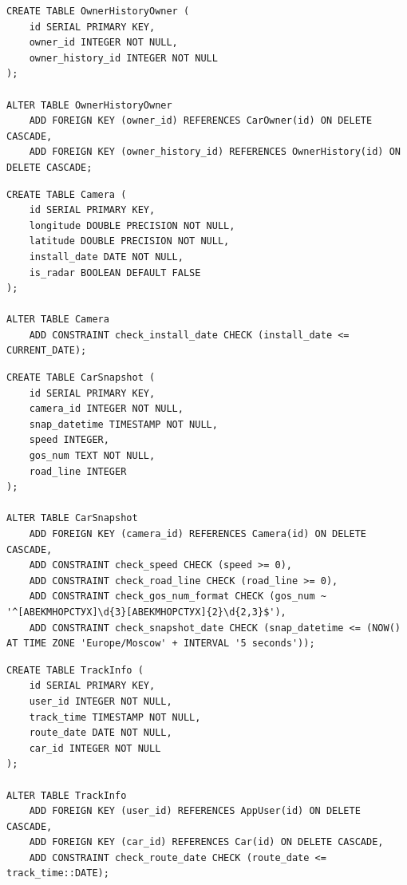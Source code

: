 \begin{center}
\captionsetup{justification=raggedright,singlelinecheck=off}
\begin{lstlisting}[label=tablecreate-7, caption=Создание таблицы OwnerHistoryOwner]
CREATE TABLE OwnerHistoryOwner (
    id SERIAL PRIMARY KEY,
    owner_id INTEGER NOT NULL,
    owner_history_id INTEGER NOT NULL
);

ALTER TABLE OwnerHistoryOwner
    ADD FOREIGN KEY (owner_id) REFERENCES CarOwner(id) ON DELETE CASCADE,
    ADD FOREIGN KEY (owner_history_id) REFERENCES OwnerHistory(id) ON DELETE CASCADE;
\end{lstlisting}
\end{center}

\begin{center}
\captionsetup{justification=raggedright,singlelinecheck=off}
\begin{lstlisting}[label=tablecreate-8, caption=Создание таблицы Camera]
CREATE TABLE Camera (
    id SERIAL PRIMARY KEY,
    longitude DOUBLE PRECISION NOT NULL,
    latitude DOUBLE PRECISION NOT NULL,
    install_date DATE NOT NULL,
    is_radar BOOLEAN DEFAULT FALSE
);

ALTER TABLE Camera
    ADD CONSTRAINT check_install_date CHECK (install_date <= CURRENT_DATE);
\end{lstlisting}
\end{center}

\begin{center}
\captionsetup{justification=raggedright,singlelinecheck=off}
\begin{lstlisting}[label=tablecreate-9, caption=Создание таблицы CarSnapshot]
CREATE TABLE CarSnapshot (
    id SERIAL PRIMARY KEY,
    camera_id INTEGER NOT NULL,
    snap_datetime TIMESTAMP NOT NULL,
    speed INTEGER,
    gos_num TEXT NOT NULL,
    road_line INTEGER
);

ALTER TABLE CarSnapshot
    ADD FOREIGN KEY (camera_id) REFERENCES Camera(id) ON DELETE CASCADE,
    ADD CONSTRAINT check_speed CHECK (speed >= 0),
    ADD CONSTRAINT check_road_line CHECK (road_line >= 0),
    ADD CONSTRAINT check_gos_num_format CHECK (gos_num ~ '^[АВЕКМНОРСТУХ]\d{3}[АВЕКМНОРСТУХ]{2}\d{2,3}$'),
    ADD CONSTRAINT check_snapshot_date CHECK (snap_datetime <= (NOW() AT TIME ZONE 'Europe/Moscow' + INTERVAL '5 seconds'));
\end{lstlisting}
\end{center}

\begin{center}
\captionsetup{justification=raggedright,singlelinecheck=off}
\begin{lstlisting}[label=tablecreate-10, caption=Создание таблицы TrackInfo]
CREATE TABLE TrackInfo (
    id SERIAL PRIMARY KEY,
    user_id INTEGER NOT NULL,
    track_time TIMESTAMP NOT NULL,
    route_date DATE NOT NULL,
    car_id INTEGER NOT NULL
);

ALTER TABLE TrackInfo
    ADD FOREIGN KEY (user_id) REFERENCES AppUser(id) ON DELETE CASCADE,
    ADD FOREIGN KEY (car_id) REFERENCES Car(id) ON DELETE CASCADE,
    ADD CONSTRAINT check_route_date CHECK (route_date <= track_time::DATE);
\end{lstlisting}
\end{center}

